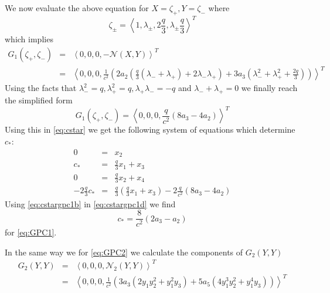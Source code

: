 We now evaluate the above equation for $X=\zeta_+, Y=\zeta_-$ where
\begin{equation}
\zeta_\pm = \left< 1, \lambda_\pm, 2 \frac{q}{3} , \lambda_\pm \frac{q}{3} \right>^T
\end{equation}
which implies
\begin{subequations}
\begin{eqnarray*}
G_1\left( \zeta_+, \zeta_- \right) &=& \left< 0 , 0, 0, - \mathcal{N}\left(X,Y\right) \right>^T \\
 &=& \left< 0, 0, 0, \frac{1}{c^2} \left( 2 a_2 \left( \frac{ q }{3} \left( \lambda_- + \lambda_+\right) + 2 \lambda_- \lambda_+\right)
 + 3 a_3 \left( \lambda_-^2 + \lambda_+^2 + \frac{2q}{3} \right) \right) \right>^T
\end{eqnarray*}
\end{subequations}
Using the facts that $\lambda_-^2 = q, \lambda_+^2 = q, \lambda_+ \lambda_- = -q $ and $\lambda_- + \lambda_+=0$ we 
finally reach the simplified form
\begin{equation}
G_1\left(\zeta_+, \zeta_-\right) = \left<0,0,0, \frac{q}{c^2} \left( 8 a_3 - 4 a_2 \right) \right>^T
\end{equation}
Using this in \eqref{eq:cstar} we get the following system of equations which determine $c_*$:
\begin{subequations}
\begin{eqnarray}
0 &=& x_2 \\
c_* &=& \frac{q}{3} x_1 + x_3 \label{eq:cstargpc1b}\\
0 &=& \frac{q}{3} x_2 + x_4 \\
-2 \frac{q}{3} c_* &=& \frac{q}{3}\left( \frac{q}{3} x_1 + x_3 \right) - 2 \frac{q}{c^2}\left( 8 a_3 - 4 a_2 \right) \label{eq:cstargpc1d}
\end{eqnarray}
\end{subequations}
Using \eqref{eq:cstargpc1b} in \eqref{eq:cstargpc1d}  we find
\begin{equation} c_* = \frac{8}{c^2}\left( 2 a_3 - a_2 \right)
\end{equation}
for \eqref{eq:GPC1}. 


In the same way we for \eqref{eq:GPC2} we calculate the components of $G_2(Y,Y)$
\begin{align}
G_2(Y,Y) &=& \left<0,0,0, \mathcal{N}_2\left(Y,Y\right) \right>^T \\
    &=& \left< 0,0,0, \frac{1}{c^2}\left( 3 a_3 \left( 2 y_1 y_2^2 + y_1^2 y_3 \right) + 5 a_5 \left( 4 y_1^3 y_2^2 + y_1^4 y_3 \right) \right) \right>^T
\end{align}


